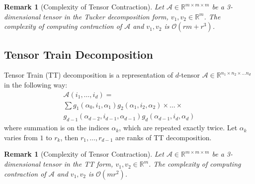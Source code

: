 \documentclass[conference]{IEEEtran}
\newtheorem{remark}[definition]{Remark}
\newcommand{\R}{\mathbb{R}}
\begin{document}
\begin{remark}[Complexity of Tensor Contraction]
Let $\mathcal{A} \in \R^{m\times m\times m}$ be a 3-dimensional tensor in the Tucker decomposition form, $v_1, v_2 \in \R^m$. The complexity of computing contraction of $\mathcal{A}$ and $v_1, v_2$ is $\mathcal{O}(rm + r^3)$.
\end{remark}

\subsection{Tensor Train Decomposition}
Tensor Train (TT) decomposition is a representation of $d$-tensor $\mathcal{A} \in \mathbb{R}^{n_1 \times n_2 \times \dots n_d } $ in the following way:
\begin{equation*}
\begin{aligned}
    \mathcal{A}(i_1,\ldots,i_d) = \\\sum
    g_1(\alpha_0,i_1,\alpha_1)g_2(\alpha_1,i_2,\alpha_2)\times\ldots\times\\ g_{d-1}(\alpha_{d-2},i_{d-1},\alpha_{d-1})g_d(\alpha_{d-1},i_d,\alpha_d)
\end{aligned}
\end{equation*}
where summation is on the indices $\alpha_k$, which are repeated exactly twice.
Let $\alpha_k$ varies from $1$ to $r_k$, then $r_1,\ldots,r_{d-1}$ are ranks of TT
decomposition. 

\begin{remark}[Complexity of Tensor Contraction]
Let $\mathcal{A} \in \R^{m\times m\times m}$ be a 3-dimensional tensor in the TT form, $v_1, v_2 \in \R^m$. The complexity of computing contraction of $\mathcal{A}$ and $v_1, v_2$ is $\mathcal{O}(mr^2)$.
\end{remark}



%
%
\end{document}
